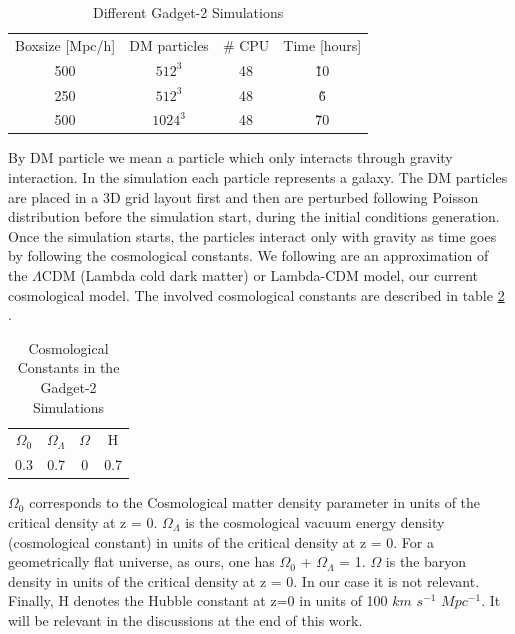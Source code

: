 \documentclass[12pt]{article}
\begin{document}
\begin{table}[ht]
    \centering
    \begin{tabular}{|c|c|c|c|}
        Boxsize [Mpc/h] & DM particles & \# CPU & Time [hours] \\
        500 & $512^{3}$ & 48 & \~ 10 \\
        250 & $512^{3}$ & 48 & \~ 6  \\
        500 & $1024^{3}$ & 48 & \~ 70  \\
    \end{tabular}
    \caption{Different Gadget-2 Simulations}
    \label{tab:sims}
\end{table}
\FloatBarrier

By DM particle we mean a particle which only
 interacts through gravity
interaction. In the simulation each particle
 represents a galaxy. The DM particles are
placed in a 3D grid layout first and then are
 perturbed following Poisson distribution
before the simulation start, during the initial
 conditions generation.\\

Once the simulation starts, the particles interact
 only with gravity as time goes by following the
  cosmological constants. We following are an
   approximation of the $\Lambda$CDM (Lambda cold
    dark matter) or Lambda-CDM model, our current
     cosmological model. The involved
     cosmological constants are described in table
      \ref{tab:consts}\\.
   
  
 \begin{table}[ht]
    \centering
    \begin{tabular}{|c|c|c|c|}
        $\Omega_0$ & $\Omega_{\Lambda}$ & $\Omega$ & H \\
        0.3 &  0.7 & 0 & 0.7 \\
    \end{tabular}
    \caption{Cosmological Constants in the Gadget-2 Simulations}
    \label{tab:consts}
\end{table}
\FloatBarrier
$\Omega_0$  corresponds to the Cosmological matter density parameter in units of the critical density at
z = 0. $\Omega_{\Lambda}$ is the cosmological
 vacuum energy density (cosmological constant) in
  units of the critical density at z = 0. 
For a geometrically flat universe, as ours, one has $\Omega_0$ + $\Omega_{\Lambda}$ = 1.
 $\Omega$ is the baryon density in units
  of the critical density at z = 0. In our case it
   is not relevant. Finally, H denotes the Hubble
    constant at z=0 in  units of 100 $km$ $s^{-1}$
     $Mpc^{-1}$. It will be relevant in the
      discussions at the end of this work.
\end{document}
